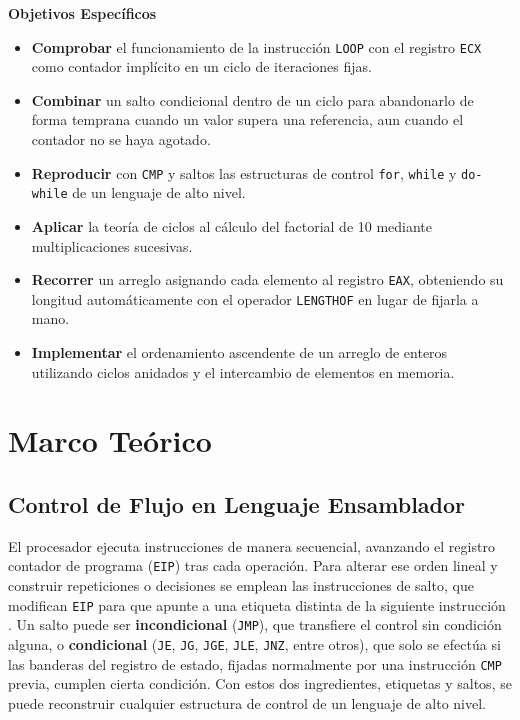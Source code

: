 \documentclass[a4paper,12pt]{article}
\begin{document}
\textbf{Objetivos Específicos}
\begin{itemize}
    \item \textbf{Comprobar} el funcionamiento de la instrucción \texttt{LOOP} con el registro \texttt{ECX} como contador implícito en un ciclo de iteraciones fijas.
    \item \textbf{Combinar} un salto condicional dentro de un ciclo para abandonarlo de forma temprana cuando un valor supera una referencia, aun cuando el contador no se haya agotado.
    \item \textbf{Reproducir} con \texttt{CMP} y saltos las estructuras de control \texttt{for}, \texttt{while} y \texttt{do-while} de un lenguaje de alto nivel.
    \item \textbf{Aplicar} la teoría de ciclos al cálculo del factorial de 10 mediante multiplicaciones sucesivas.
    \item \textbf{Recorrer} un arreglo asignando cada elemento al registro \texttt{EAX}, obteniendo su longitud automáticamente con el operador \texttt{LENGTHOF} en lugar de fijarla a mano.
    \item \textbf{Implementar} el ordenamiento ascendente de un arreglo de enteros utilizando ciclos anidados y el intercambio de elementos en memoria.
\end{itemize}

\section{Marco Teórico}
\subsection{Control de Flujo en Lenguaje Ensamblador}
El procesador ejecuta instrucciones de manera secuencial, avanzando el registro contador de programa (\texttt{EIP}) tras cada operación. Para alterar ese orden lineal y construir repeticiones o decisiones se emplean las instrucciones de salto, que modifican \texttt{EIP} para que apunte a una etiqueta distinta de la siguiente instrucción \cite{irvine2020assembly}. Un salto puede ser \textbf{incondicional} (\texttt{JMP}), que transfiere el control sin condición alguna, o \textbf{condicional} (\texttt{JE}, \texttt{JG}, \texttt{JGE}, \texttt{JLE}, \texttt{JNZ}, entre otros), que solo se efectúa si las banderas del registro de estado, fijadas normalmente por una instrucción \texttt{CMP} previa, cumplen cierta condición. Con estos dos ingredientes, etiquetas y saltos, se puede reconstruir cualquier estructura de control de un lenguaje de alto nivel.
\end{document}
